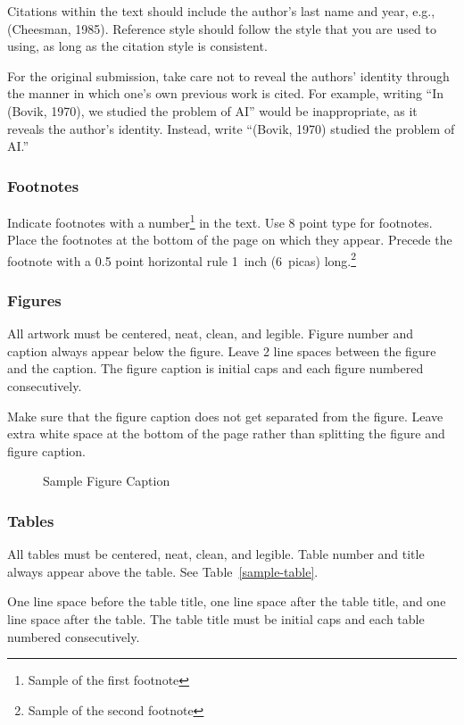 \documentclass[letterpaper]{article}
\begin{document}
Citations within the text should include the author's last name and
year, e.g., (Cheesman, 1985). Reference style should follow the style
that you are used to using, as long as the citation style is
consistent.

For the original submission, take care not to reveal the authors' identity through
the manner in which one's own previous work is cited.  For example, writing
``In (Bovik, 1970), we studied the problem of AI'' would be inappropriate, as
it reveals the author's identity.  Instead, write ``(Bovik, 1970) studied the
problem of AI.''

\subsubsection{Footnotes}

Indicate footnotes with a number\footnote{Sample of the first
footnote} in the text. Use 8 point type for footnotes.  Place the
footnotes at the bottom of the page on which they appear.  Precede the
footnote with a 0.5 point horizontal rule 1~inch (6~picas)
long.\footnote{Sample of the second footnote}

\subsubsection{Figures}

All artwork must be centered, neat, clean, and legible. Figure number
and caption always appear below the figure.  Leave 2 line spaces
between the figure and the caption. The figure caption is initial caps
and each figure numbered consecutively.

Make sure that the figure caption does not get separated from the
figure. Leave extra white space at the bottom of the page rather than
splitting the figure and figure caption.
\begin{figure}[h]
\vspace{1in}
\caption{Sample Figure Caption}
\end{figure}

\subsubsection{Tables}

All tables must be centered, neat, clean, and legible. Table number
and title always appear above the table.  See
Table~\ref{sample-table}.

One line space before the table title, one line space after the table
title, and one line space after the table. The table title must be
initial caps and each table numbered consecutively.
\end{document}
